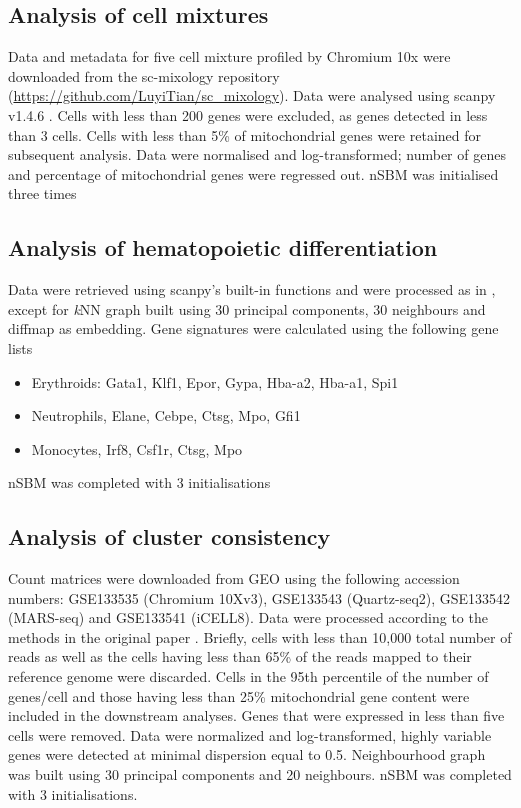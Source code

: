 \documentclass[10pt]{article}
\begin{document}
\subsection*{Analysis of cell mixtures}

Data and metadata for five cell mixture profiled by Chromium 10x were downloaded from the sc-mixology repository (\href{https://github.com/LuyiTian/sc_mixology}{https:/\slash github.com\slash LuyiTian\slash sc\_mixology}). Data were analysed using scanpy v1.4.6 \cite{wolf_2018}. Cells with less than 200 genes were excluded, as genes detected in less than 3 cells. Cells with less than 5\% of mitochondrial genes were retained for subsequent analysis. Data were normalised and log-transformed; number of genes and percentage of mitochondrial genes were regressed out. nSBM was initialised three times

\subsection*{Analysis of hematopoietic differentiation}

Data were retrieved using scanpy's built-in functions and were processed as in \cite{wolf_2019}, except for \emph{k}NN graph built using 30 principal components, 30 neighbours and diffmap as embedding. Gene signatures were calculated using the following gene lists
\begin{itemize}
\item Erythroids: Gata1, Klf1, Epor, Gypa, Hba-a2, Hba-a1, Spi1
\item Neutrophils, Elane, Cebpe, Ctsg, Mpo, Gfi1
\item Monocytes, Irf8, Csf1r, Ctsg, Mpo
\end{itemize}

nSBM was completed with 3 initialisations

\subsection*{Analysis of cluster consistency}

Count matrices were downloaded from GEO using the following accession numbers: GSE133535 (Chromium 10Xv3), GSE133543 (Quartz-seq2), GSE133542 (MARS-seq) and GSE133541 (iCELL8). Data were processed according to the methods in the original paper \cite{mereu_2020}. Briefly, cells with less than 10,000 total number of reads as well as the cells having less than 65\% of the reads mapped to their reference genome were discarded. Cells in the 95th percentile of the number of genes/cell and those having less than 25\% mitochondrial gene content were included in the downstream analyses. Genes that were expressed in less than five cells were removed. Data were normalized and log-transformed, highly variable genes were detected at minimal dispersion equal to 0.5. Neighbourhood graph was built using 30 principal components and 20 neighbours. nSBM was completed with 3 initialisations. 
\end{document}
